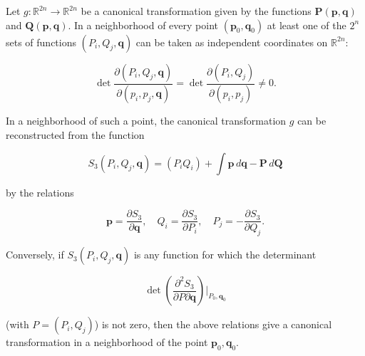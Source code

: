 Let $g: \mathbb{R}^{2n} \to \mathbb{R}^{2n}$ be a canonical transformation given by the functions $\mathbf{P}(\mathbf{p}, \mathbf{q})$ and $\mathbf{Q}(\mathbf{p}, \mathbf{q})$. In a neighborhood of every point $(\mathbf{p}_0, \mathbf{q}_0)$ at least one of the $2^n$ sets of functions $(P_i, Q_j, \mathbf{q})$ can be taken as independent coordinates on $\mathbb{R}^{2n}$:

$$\det \frac{\partial(P_i, Q_j, \mathbf{q})}{\partial(p_i, p_j, \mathbf{q})} = \det \frac{\partial(P_i, Q_j)}{\partial(p_i, p_j)} \neq 0.$$

In a neighborhood of such a point, the canonical transformation $g$ can be reconstructed from the function

$$S_3(P_i, Q_j, \mathbf{q}) = (P_i Q_i) + \int \mathbf{p} \, d\mathbf{q} - \mathbf{P} \, d\mathbf{Q}$$

by the relations

$$\mathbf{p} = \frac{\partial S_3}{\partial \mathbf{q}}, \quad Q_i = \frac{\partial S_3}{\partial P_i}, \quad P_j = -\frac{\partial S_3}{\partial Q_j}.$$

Conversely, if $S_3(P_i, Q_j, \mathbf{q})$ is any function for which the determinant

$$\det\left( \frac{\partial^2 S_3}{\partial P \partial \mathbf{q}} \right)\bigg|_{P_0, \mathbf{q}_0}$$

(with $P = (P_i, Q_j)$) is not zero, then the above relations give a canonical transformation in a neighborhood of the point $\mathbf{p}_0, \mathbf{q}_0$.

